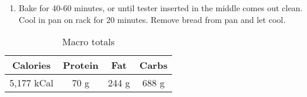 \documentclass{report}
\begin{document}
\begin{multicols}{2}
\begin{enumerate}
 \item Bake for 40-60 minutes, or until tester inserted in the middle comes out clean. Cool in pan on rack for 20 minutes. Remove bread from pan and let cool.   
\end{enumerate}
\begin{table}[H]
  \begin{center}
    \caption{Macro totals}
    \label{tab:table1}
    \begin{tabular}{c|c|c|c} %
      \textbf{Calories} & \textbf{Protein} & \textbf{Fat} & \textbf{Carbs}\\
      \hline
      5,177 kCal & 70 g & 244 g & 688 g\\
    \end{tabular}
  \end{center}
\end{table}
\end{multicols}



\end{document}
